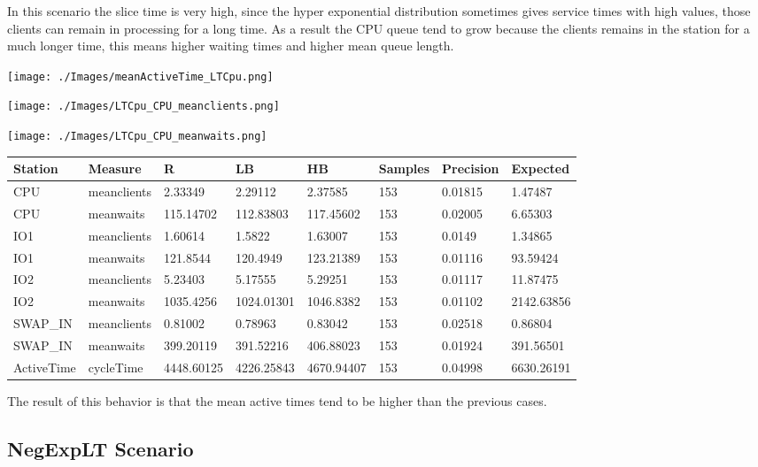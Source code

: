 \documentclass[12pt,a4paper]{article}
\begin{document}
In this scenario the slice time is very high, since the hyper exponential distribution sometimes gives service times with high values, those clients can remain in processing for a long time. As a result the CPU queue tend to grow because the clients remains in the station for a much longer time, this means higher waiting times and higher mean queue length.

\texttt{[image: ./Images/meanActiveTime\_LTCpu.png]}


\texttt{[image: ./Images/LTCpu\_CPU\_meanclients.png]}


\texttt{[image: ./Images/LTCpu\_CPU\_meanwaits.png]}


\begin{table}[!ht]
    \centering
    \begin{tabular}{|l|l|l|l|l|l|l|l|}
    \hline
        Station & Measure & R & LB & HB & Samples & Precision & Expected \\ \hline
        CPU & meanclients & 2.33349 & 2.29112 & 2.37585 & 153 & 0.01815 & 1.47487 \\ \hline
        CPU & meanwaits & 115.14702 & 112.83803 & 117.45602 & 153 & 0.02005 & 6.65303 \\ \hline
        IO1 & meanclients & 1.60614 & 1.5822 & 1.63007 & 153 & 0.0149 & 1.34865 \\ \hline
        IO1 & meanwaits & 121.8544 & 120.4949 & 123.21389 & 153 & 0.01116 & 93.59424 \\ \hline
        IO2 & meanclients & 5.23403 & 5.17555 & 5.29251 & 153 & 0.01117 & 11.87475 \\ \hline
        IO2 & meanwaits & 1035.4256 & 1024.01301 & 1046.8382 & 153 & 0.01102 & 2142.63856 \\ \hline
        SWAP\_IN & meanclients & 0.81002 & 0.78963 & 0.83042 & 153 & 0.02518 & 0.86804 \\ \hline
        SWAP\_IN & meanwaits & 399.20119 & 391.52216 & 406.88023 & 153 & 0.01924 & 391.56501 \\ \hline
        ActiveTime & cycleTime & 4448.60125 & 4226.25843 & 4670.94407 & 153 & 0.04998 & 6630.26191 \\ \hline
    \end{tabular}
\end{table}

The result of this behavior is that the mean active times tend to be higher than the previous cases.

\subsection{NegExpLT Scenario}
\end{document}
